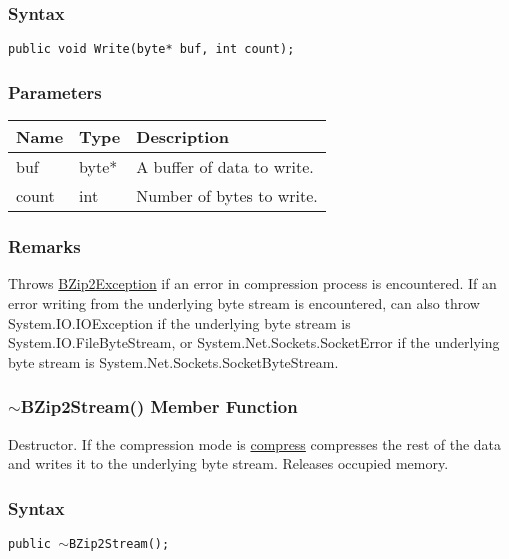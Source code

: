 \documentclass[a4paper,oneside,11.000000pt]{book}
\begin{document}
\subsubsection*{Syntax}\texttt{public void Write(byte* buf, int count);}

\subsubsection*{Parameters}
\begin{flushleft}
\begin{supertabular}[l]{lll}
\textbf{Name}
& \textbf{Type}
& \textbf{Description}
\\
\hline
buf
& byte*
& A buffer of data to write.

\\
count
& int
& Number of bytes to write.

\\
\end{supertabular}

\end{flushleft}
\subsubsection*{Remarks}
\begin{flushleft}
Throws \hyperlink{System.IO.Compression.BZip2Exception}{BZip2Exception} if an error in compression process is encountered.
If an error writing from the underlying byte stream is encountered,
can also throw System.\-IO.\-IOException if the underlying byte stream is System.\-IO.\-FileByteStream, or
System.\-Net.\-Sockets.\-SocketError if the underlying byte stream is System.\-Net.\-Sockets.\-SocketByteStream.

\end{flushleft}
\clearpage

\hypertarget{System.IO.Compression.BZip2Stream.destructor.P.System.IO.Compression.BZip2Stream}{\subsubsection*{$\sim$BZip2Stream() Member Function}}
\begin{flushleft}
Destructor. If the compression mode is \hyperlink{System.IO.Compression.CompressionMode.compress}{compress} compresses the rest of the data
and writes it to the underlying byte stream. Releases occupied memory.

\end{flushleft}
\subsubsection*{Syntax}\texttt{public $\sim$BZip2Stream();}
\clearpage
\end{document}
